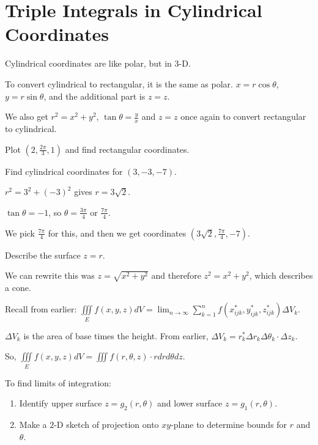 \documentclass[../calc3.tex]{subfiles}
\begin{document}
\section{Triple Integrals in Cylindrical Coordinates}
Cylindrical coordinates are like polar, but in $3$-D.

To convert cylindrical to rectangular, it is the same as polar. $x=r\cos\theta$, $y=r\sin\theta$, and the additional part is $z=z$.

We also get $r^2=x^2+y^2$, $\tan\theta = \frac{y}{x}$ and $z=z$ once again to convert rectangular to cylindrical.

\ex Plot $\left(2,\frac{2\pi}{3}, 1\right)$ and find rectangular coordinates.

\pagebreak
\begin{example}
    Find cylindrical coordinates for $(3,-3,-7)$.

    $r^2=3^2+(-3)^2$ gives $r=3\sqrt{2}$.

    $\tan\theta = -1$, so $\theta = \frac{3\pi}{4}$ or $\frac{7\pi}{4}$.

    We pick $\frac{7\pi}{4}$ for this, and then we get coordinates $(3\sqrt{2}, \frac{7\pi}{4}, -7)$.
\end{example}

\begin{example}
    Describe the surface $z=r$.

    We can rewrite this was $z=\sqrt{x^2+y^2}$ and therefore $z^2=x^2+y^2$, which describes a cone.
\end{example}

Recall from earlier: $\iiint\limits_{E} f(x,y,z)dV = \lim_{n\to\infty}\sum_{k=1}^n f\left(x_{ijk}^*, y_{ijk}^*, z_{ijk}^*\right)\Delta V_k$.

$\Delta V_k$ is the area of base times the height. From earlier, $\Delta V_k = r_k^* \Delta r_k \Delta \theta_k\cdot \Delta z_k$.

So, $\iiint\limits_{E} f(x,y,z)dV = \iiint f(r,\theta,z)\cdot r dr d\theta dz$.

To find limits of integration:
\begin{enumerate}
    \item Identify upper surface $z=g_2(r,\theta)$ and lower surface $z=g_1(r,\theta)$.
    \item Make a $2$-D sketch of projection onto $xy$-plane to determine bounds for $r$ and $\theta$.
\end{enumerate}
\end{document}
